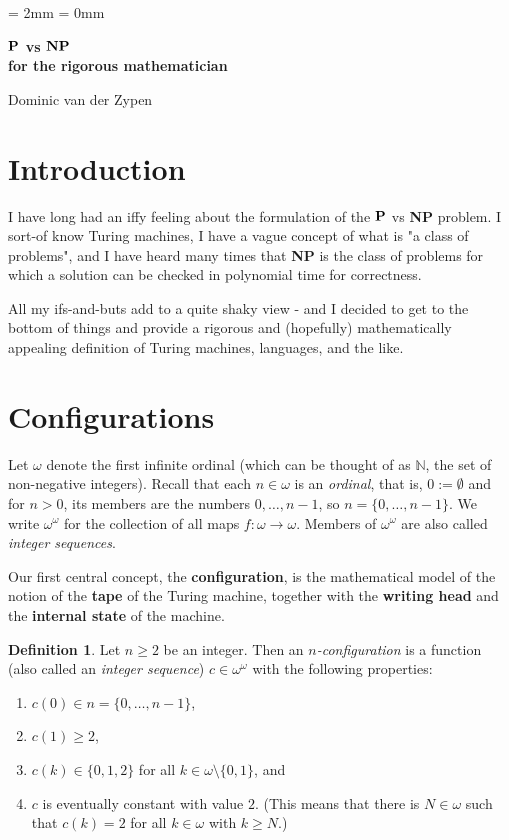\documentclass[12pt, a4paper]{amsart}
\theoremstyle{definition}
\newtheorem{definition}[lemma]{Definition}
\begin{document}
\parskip = 2mm
\parindent = 0mm

\begin{center}
    \textbf{\Large ${\bf P}$ vs ${\bf NP}$ \\ for the rigorous mathematician}
\end{center}

\vspace*{3mm}

\begin{center}
Dominic van der Zypen
\end{center}

\section{Introduction}
I have long had an iffy feeling about the formulation of the ${\bf P}$ vs {\bf NP} problem. 
I sort-of know Turing machines, I have a vague concept of what is "a class of problems", 
and I have heard many times that {\bf NP} is the class of problems for which a solution 
can be checked in polynomial time for correctness.

All my ifs-and-buts add to a quite shaky view - and I decided to get to the bottom of 
things and provide a rigorous and (hopefully) mathematically appealing definition of 
Turing machines, languages, and the like. 

\section{Configurations}

Let $ \omega$ denote the first infinite ordinal (which can be thought 
of as $ \mathbb{N}$, the set of non-negative integers). Recall that each
$n \in \omega$ is an {\em ordinal}, that is, $0:=\emptyset$ and for $n>0$,
its members are the numbers $ 0,\ldots, n-1$, so $ n = \{0,\ldots,n-1\}$. 
We write $\omega^\omega$ for the collection of all maps $f:\omega \to \omega$.
Members of $\omega^\omega$ are also called {\sl integer sequences}.

Our first 
central concept, the {\bf configuration}, is the mathematical model of the 
notion of the {\bf tape} of the Turing machine, together with the {\bf writing 
head} and the {\bf internal state} of the machine. 


\begin{definition} Let $n \geq 2$ be an integer. Then an {\em $n$-configuration} is a 
    function (also called an {\sl integer sequence}) $c\in \omega^\omega$ with the 
    following properties:
    \begin{enumerate}
        \item $c(0) \in n = \{0,\ldots,n-1\}$,
        \item $c(1) \geq 2$,
        \item $c(k) \in \{0,1,2\}$ for all $k\in\omega\setminus\{0,1\}$, and
        \item $c$ is eventually constant with value $2$. (This means
            that there is $N\in \omega$ such that $c(k) = 2$ for all $k\in \omega$
            with $k\geq N$.)
    \end{enumerate}
\end{definition}
\end{document}
